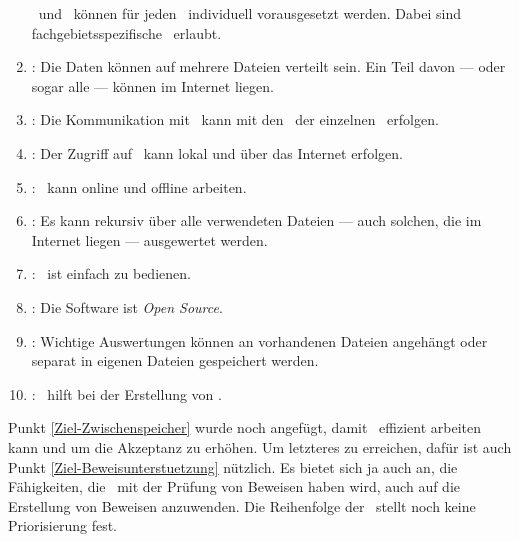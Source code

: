 \begin{enumerate}
	\Axiome\ und \Saetze\ können für jeden \Beweis\ individuell vorausgesetzt werden.
	Dabei sind fachgebietsspezifische \Fachbegriffe\ erlaubt.
	\item \label{Ziel-Internet} :
	Die Daten können auf mehrere Dateien verteilt sein.
	Ein Teil davon --- oder sogar alle --- können im Internet liegen.
	\item \label{Ziel-Kommunikation} :
	Die Kommunikation mit \ASBA\ kann mit den \Fachbegriffen\ der einzelnen \Teilgebiete\ erfolgen.
	\item \label{Ziel-Zugriff} :
	Der Zugriff auf \ASBA\ kann lokal und über das Internet erfolgen.
	\item \label{Ziel-Unabhaengigkeit} :
	\ASBA\ kann online und offline arbeiten.
	\item \label{Ziel-Rekursion} :
	Es kann rekursiv über alle verwendeten Dateien --- auch solchen, die im Internet liegen --- ausgewertet werden.
	\item \label{Ziel-Bedienbarkeit} :
	\ASBA\ ist einfach zu bedienen.
	\item \label{Ziel-Lizenz} :
	Die Software ist \emph{Open Source}.
	\item \label{Ziel-Zwischenspeicher} :
	Wichtige Auswertungen können an vorhandenen Dateien angehängt oder separat in eigenen Dateien gespeichert werden.
	\item \label{Ziel-Beweisunterstuetzung} :
	\ASBA\ hilft bei der Erstellung von \Beweisen.
\end{enumerate}
%
Punkt \ref{Ziel-Zwischenspeicher} wurde noch angefügt, damit \ASBA\ effizient arbeiten kann und um die Akzeptanz zu erhöhen.
Um letzteres zu erreichen, dafür ist auch Punkt \ref{Ziel-Beweisunterstuetzung} nützlich.
Es bietet sich ja auch an, die Fähigkeiten, die \ASBA\ mit der Prüfung von Beweisen haben wird, auch auf die Erstellung von Beweisen anzuwenden.
Die Reihenfolge der \Ziele\ stellt noch keine Priorisierung fest.

